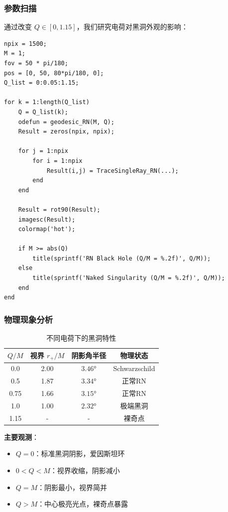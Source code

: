 \documentclass[a4paper,12pt]{article}
\begin{document}
\subsubsection{参数扫描}

通过改变 $Q \in [0, 1.15]$，我们研究电荷对黑洞外观的影响：

\begin{lstlisting}[caption={渲染主循环}]
npix = 1500;
M = 1;
fov = 50 * pi/180;
pos = [0, 50, 80*pi/180, 0];
Q_list = 0:0.05:1.15;

for k = 1:length(Q_list)
    Q = Q_list(k);
    odefun = geodesic_RN(M, Q);
    Result = zeros(npix, npix);
    
    for j = 1:npix
        for i = 1:npix
            Result(i,j) = TraceSingleRay_RN(...);
        end
    end
    
    Result = rot90(Result);
    imagesc(Result);
    colormap('hot');
    
    if M >= abs(Q)
        title(sprintf('RN Black Hole (Q/M = %.2f)', Q/M));
    else
        title(sprintf('Naked Singularity (Q/M = %.2f)', Q/M));
    end
end
\end{lstlisting}

\subsubsection{物理现象分析}

\begin{table}[H]
\centering
\caption{不同电荷下的黑洞特性}
\begin{tabular}{cccc}
\toprule
$Q/M$ & 视界 $r_+/M$ & 阴影角半径 & 物理状态 \\
\midrule
0.0 & 2.00 & $3.46°$ & Schwarzschild \\
0.5 & 1.87 & $3.34°$ & 正常RN \\
0.75 & 1.66 & $3.15°$ & 正常RN \\
1.0 & 1.00 & $2.32°$ & 极端黑洞 \\
1.15 & - & - & 裸奇点 \\
\bottomrule
\end{tabular}
\end{table}

\textbf{主要观测}：
\begin{itemize}
    \item $Q = 0$：标准黑洞阴影，爱因斯坦环
    \item $0 < Q < M$：视界收缩，阴影减小
    \item $Q = M$：阴影最小，视界简并
    \item $Q > M$：中心极亮光点，裸奇点暴露
\end{itemize}
\end{document}
